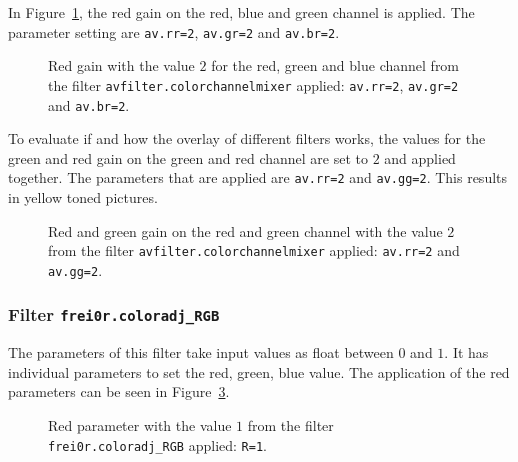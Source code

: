 \documentclass[../MasterThesis.tex]{subfiles}
\begin{document}
In Figure~\ref{figure:rrbrgr}, the red gain on the red, blue and green channel is applied. The parameter setting are \texttt{av.rr=2}, \texttt{av.gr=2} and \texttt{av.br=2}.


\begin{figure}[H]
	\begin{center}
		\label{figure:rrbrgr}
		\caption[Red gain set to $2$ with \texttt{avfilter.colorchannelmixer}.]{Red gain with the value $2$ for the red, green and blue channel from the filter \texttt{avfilter.colorchannelmixer} applied: \texttt{av.rr=2}, \texttt{av.gr=2} and \texttt{av.br=2}.}
	\end{center}
\end{figure}


To evaluate if and how the overlay of different filters works, the values for the green and red gain on the green and red channel are set to $2$ and applied together. The parameters that are applied are \texttt{av.rr=2} and \texttt{av.gg=2}. This results in yellow toned pictures.


\begin{figure}[H]
	\begin{center}
		\label{figure:rrgg}
		\caption[Red and green gain set to $2$ with \texttt{avfilter.colorchannelmixer}.]{Red and green gain on the red and green channel with the value $2$ from the filter \texttt{avfilter.colorchannelmixer} applied: \texttt{av.rr=2} and \texttt{av.gg=2}.}
	\end{center}
\end{figure}







\subsubsection*{Filter \texttt{frei0r.coloradj\_RGB}}

The parameters of this filter take input values as float between $0$ and $1$. It has individual parameters to set the red, green, blue value. The application of the red parameters can be seen in Figure~\ref{figure:r}.


\begin{figure}[H]
	\begin{center}
		\label{figure:r}
		\caption[Red parameter set to $1$ with \texttt{frei0r.coloradj\_RGB}.]{Red parameter with the value $1$ from the filter \texttt{frei0r.coloradj\_RGB} applied: \texttt{R=1}.}
	\end{center}
\end{figure}
\end{document}
